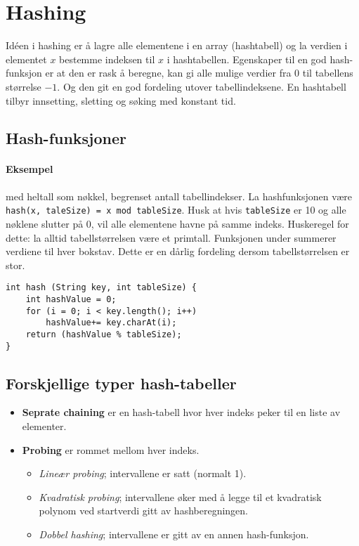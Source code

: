 \documentclass[11pt,a4paper]{article}
\theoremstyle{def}
\begin{document}
\newpage

\section{Hashing}
Idéen i hashing er å lagre alle elementene i en array (hashtabell) og la verdien i elementet $x$ bestemme indeksen til $x$ i hashtabellen. Egenskaper til en god hash-funksjon er at den er rask å beregne, kan gi alle mulige verdier fra 0 til tabellens størrelse $-1$. Og den git en god fordeling utover tabellindeksene. En hashtabell tilbyr innsetting, sletting og søking med konstant tid.

\subsection{Hash-funksjoner}
\paragraph{Eksempel} med heltall som nøkkel, begrenset antall tabellindekser. La hashfunksjonen være \texttt{hash(x, taleSize) = x mod tableSize}. Husk at hvis \texttt{tableSize} er 10 og alle nøklene slutter på 0, vil alle elementene havne på samme indeks. Huskeregel for dette: la alltid tabellstørrelsen være et primtall. Funksjonen under summerer verdiene til hver bokstav. Dette er en dårlig fordeling dersom tabellstørrelsen er stor.
\begin{lstlisting}
int hash (String key, int tableSize) {
	int hashValue = 0;
	for (i = 0; i < key.length(); i++) 
		hashValue+= key.charAt(i);
	return (hashValue % tableSize);
}
\end{lstlisting}

\subsection{Forskjellige typer hash-tabeller}
\begin{itemize}
\item
\textbf{Seprate chaining} er en hash-tabell hvor hver indeks peker til en liste av elementer.
\item
\textbf{Probing} er rommet mellom hver indeks.
\begin{itemize}
\item
\textit{Lineær probing}; intervallene er satt (normalt 1).
\item
\textit{Kvadratisk probing}; intervallene øker med å legge til et kvadratisk polynom ved startverdi gitt av hashberegningen.
\item
\textit{Dobbel hashing}; intervallene er gitt av en annen hash-funksjon.
\end{itemize}
\end{itemize}
\end{document}
